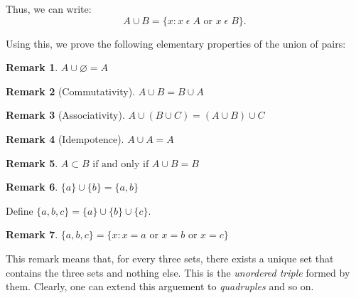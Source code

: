 \documentclass[12pt]{article}
\newtheorem{remark}{Remark}
\begin{document}
Thus, we can write:
\begin{equation}
    A \cup B = \{x: x\;\epsilon\;A \text{ or } x\;\epsilon\;B\}.
\end{equation}

Using this, we prove the following elementary properties of the union of pairs:
\begin{remark}
    $A \cup\varnothing = A$
\end{remark}

\begin{remark}[Commutativity]
    $A \cup B = B \cup A$
\end{remark}

\begin{remark}[Associativity]
    $A \cup (B \cup C) = (A \cup B) \cup C$
\end{remark}

\begin{remark}[Idempotence]
    $A \cup A = A$
\end{remark}

\begin{remark}
    $A \subset B \text{ if and only if } A \cup B = B$
\end{remark}

\begin{remark}
    $\{a\} \cup \{b\} = \{a, b\}$
\end{remark}

Define $\{a, b, c\} = \{a\} \cup \{b\} \cup \{c\}$.

\begin{remark}
    $\{a, b, c\} = \{x: x = a \text{ or } x = b \text{ or } x = c\}$
\end{remark}

This remark means that, for every three sets, there exists a unique set that contains the three sets and
nothing else. This is the \textit{unordered triple} formed by them. Clearly, one can extend this arguement to \textit{quadruples}
and so on.
\end{document}
